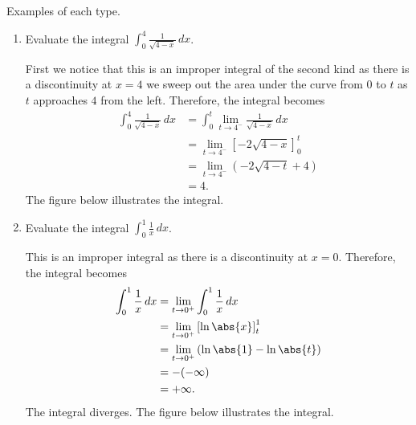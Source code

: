 \documentclass[12pt, a4paper]{article}
\begin{document}
\begin{example}
    Examples of each type.
    \begin{enumerate}
        \item Evaluate the integral \(\int_{0}^{4} \frac{1}{\sqrt{4-x}} \, dx\).
        \begin{solution}
            First we notice that this is an improper integral of the second kind as there is a discontinuity at \(x=4\) we sweep out the area under the curve from \(0\) to \(t\) as \(t\) approaches \(4\) from the left. Therefore, the integral becomes 
            \[\begin{aligned}
                \int_{0}^{4} \frac{1}{\sqrt{4-x}} \, dx &= \int_{0}^{t} \lim_{t \to 4^-} \frac{1}{\sqrt{4-x}} \, dx \\
                &= \lim_{t \to 4^-} \left[ -2\sqrt{4-x} \right]_0^t \\
                &=\lim_{t \to 4^-} (-2\sqrt{4-t}+4) \\
                &=4.
            \end{aligned}\]
            The figure below illustrates the integral.
            \begin{figure}[H]
                \begin{center}
                   
                \end{center}
           \end{figure}
        \end{solution}
        \item Evaluate the integral \(\int_{0}^{1} \frac{1}{x} \, dx\).
        \begin{solution}
            This is an improper integral as there is a discontinuity at \(x=0\). Therefore, the integral becomes 
            \[\begin{aligned}
                \int_{0}^{1} \frac{1}{x} \, dx &= \lim_{t \to 0^+} \int_{0}^{1} \frac{1}{x} \, dx \\
                &= \lim_{t \to 0^+} \left[ \ln\abs{x} \right]_t^1 \\
                &= \lim_{t \to 0^+} \left( \ln\abs{1} -\ln\abs{t} \right) \\
                &= -(-\infty) \\
                &= +\infty.
            \end{aligned}\]
            The integral diverges. The figure below illustrates the integral.
            \begin{figure}[H]

\end{figure}
\end{solution}
\end{enumerate}
\end{example}
\end{document}
